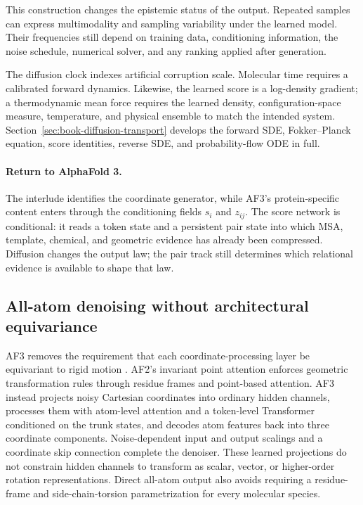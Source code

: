 This construction changes the epistemic status of the output.  Repeated samples can express
multimodality and sampling variability under the learned model.  Their frequencies still depend on
training data, conditioning information, the noise schedule, numerical solver, and any ranking
applied after generation.

The diffusion clock indexes artificial corruption scale.  Molecular time requires a calibrated
forward dynamics.  Likewise, the learned score is a log-density gradient; a thermodynamic mean
force requires the learned density, configuration-space measure, temperature, and physical
ensemble to match the intended system.  Section~\ref{sec:book-diffusion-transport} develops the
forward SDE, Fokker--Planck equation, score identities, reverse SDE, and probability-flow ODE in
full.

\paragraph{Return to AlphaFold 3.}
The interlude identifies the coordinate generator, while AF3's protein-specific content enters
through the conditioning fields $s_i$ and $z_{ij}$.  The score network is conditional: it reads a
token state and a persistent pair state into which MSA, template,
chemical, and geometric evidence has already been compressed.  Diffusion changes the output law;
the pair track still determines which relational evidence is available to shape that law.

\subsection{All-atom denoising without architectural equivariance}
\label{sec:book-af3-symmetry}

AF3 removes the requirement that each coordinate-processing layer be equivariant to rigid motion
\cite{abramson2024}.  AF2's invariant point attention enforces geometric transformation rules
through residue frames and point-based attention.  AF3 instead projects noisy Cartesian
coordinates into ordinary hidden channels, processes them with atom-level attention and a
token-level Transformer conditioned on the trunk states, and decodes atom features back into
three coordinate components.  Noise-dependent input and output scalings and a coordinate skip
connection complete the denoiser.  These learned projections do not constrain hidden channels to
transform as scalar, vector, or higher-order rotation representations.  Direct all-atom output
also avoids requiring a residue-frame and side-chain-torsion parametrization for every molecular
species.

